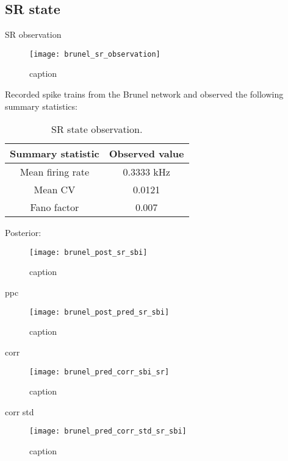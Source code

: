 \subsection{SR state}

SR observation

\begin{figure}[H]
    \centering
    \texttt{[image: brunel\_sr\_observation]}
    \caption{caption}
    \label{fig:fig1}
\end{figure}

Recorded spike trains from the Brunel network and observed the following summary statistics:

\begin{table}[H]
  \caption{SR state observation.}
  \begin{center}
    \begin{tabular}{cc}
      \toprule
      \textbf{Summary statistic} & \textbf{Observed value} \\
      \midrule
      Mean firing rate &  0.3333 kHz \\
      Mean CV &  0.0121  \\
      Fano factor & 0.007  \\
      \bottomrule
    \end{tabular}
  \end{center}
  \label{tab:hh_noisy_sumstats}
\end{table}

Posterior:

\begin{figure}[H]
    \centering
    \texttt{[image: brunel\_post\_sr\_sbi]}
    \caption{caption}
    \label{fig:fig1}
\end{figure}

ppc 

\begin{figure}[H]
    \centering
    \texttt{[image: brunel\_post\_pred\_sr\_sbi]}
    \caption{caption}
    \label{fig:fig1}
\end{figure}

corr 

\begin{figure}[H]
    \centering
    \texttt{[image: brunel\_pred\_corr\_sbi\_sr]}
    \caption{caption}
    \label{fig:fig1}
\end{figure}

corr std

\begin{figure}[H]
    \centering
    \texttt{[image: brunel\_pred\_corr\_std\_sr\_sbi]}
    \caption{caption}
    \label{fig:fig1}
\end{figure}
